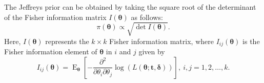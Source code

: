 \documentclass[]{interact}
\newcommand{\f}{\operatorname}
\theoremstyle{plain}%
\theoremstyle{definition}
\theoremstyle{remark}
\begin{document}
The Jeffreys prior can be obtained by taking the square root of the determinant of the Fisher information matrix $I(\boldsymbol{\theta})$ as follows:
\begin{equation}\label{jeffreysp} 
\pi(\boldsymbol{\theta})\propto \sqrt{\det I(\boldsymbol{\theta})}.
\end{equation}
Here, $I(\boldsymbol{\theta})$ represents the $k\times k$ Fisher information matrix, where $I_{ij}(\boldsymbol{\theta})$ is the Fisher information element of $\boldsymbol{\theta}$ in $i$ and $j$  given by
\begin{equation*}%
I_{ij}(\boldsymbol{\theta})=\f{E}_{\boldsymbol{\theta}}\left[-\frac{\partial^2}{\partial \theta_i \partial \theta_j}\log(L(\boldsymbol{\theta};\boldsymbol{t,\delta}))\right],\ i,j=1,2,\ldots,k.
\end{equation*}
\end{document}
